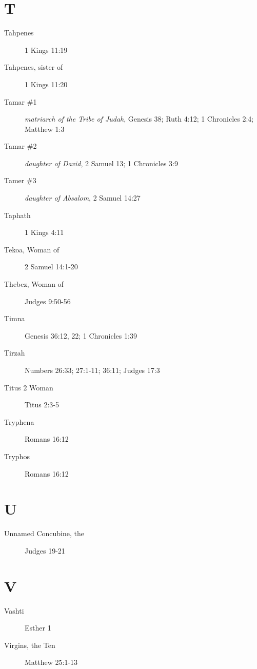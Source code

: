 \documentclass[12pt,letter,twoside,openany]{extbook}
\begin{document}
\chapter*{T}
\begin{description}
	\item [Tahpenes] 1 Kings 11:19
	\item [Tahpenes, sister of] 1 Kings 11:20
	\item [Tamar \#1] \textit{matriarch of the Tribe of Judah}, Genesis 38; Ruth 4:12; 1 Chronicles 2:4; Matthew 1:3
	\item [Tamar \#2] \textit{daughter of David}, 2 Samuel 13; 1 Chronicles 3:9
	\item [Tamer \#3] \textit{daughter of Absalom}, 2 Samuel 14:27
	\item [Taphath] 1 Kings 4:11
	\item [Tekoa, Woman of] 2 Samuel 14:1-20
	\item [Thebez, Woman of] Judges 9:50-56
	\item [Timna] Genesis 36:12, 22; 1 Chronicles 1:39
	\item [Tirzah] Numbers 26:33; 27:1-11; 36:11; Judges 17:3
	\item [Titus 2 Woman] Titus 2:3-5
	\item [Tryphena] Romans 16:12
	\item [Tryphos] Romans 16:12
	
\end{description}

\chapter*{U}
\begin{description}
	\item [Unnamed Concubine, the] Judges 19-21
\end{description}

\chapter*{V}
\begin{description}
	\item [Vashti] Esther 1
	\item [Virgins, the Ten] Matthew 25:1-13
\end{description}
\end{document}

